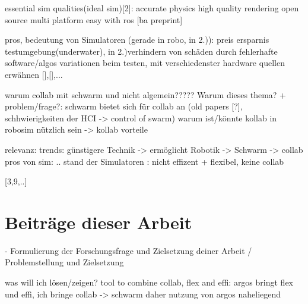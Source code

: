 \documentclass[german,version-2020-11]{uzl-thesis}
\begin{document}
essential sim qualities(ideal sim)[2]:
	accurate physics
	high quality rendering
	open source
	multi platform
	easy with ros
[ba preprint]





      
      
      pros, bedeutung von Simulatoren (gerade in robo, in 2.)):
        preis ersparnis  testumgebung(underwater), 
        in 2.)verhindern von schäden durch fehlerhafte software/algos
        variationen beim testen, mit verschiedenster hardware  
        quellen erwähnen [],[],...

    
      



      \begin{Code}

      warum collab mit schwarm und nicht algemein?????
        Warum dieses thema? + problem/frage?:
      schwarm bietet sich für collab an  (old papers [?], schhwierigkeiten der HCI -> control of swarm)
      warum ist/könnte kollab in robosim nützlich sein -> kollab vorteile

      relevanz:
      trends: günstigere Technik -> ermöglicht Robotik -> Schwarm -> collab
      pros von sim: ..
      stand der Simulatoren : nicht effizent + flexibel, keine collab

      [3,9,..]

    


      \end{Code}







\section{Beiträge dieser Arbeit}

%

- Formulierung der Forschungsfrage und Zielsetzung deiner Arbeit / Problemstellung und Zielsetzung

was will ich lösen/zeigen?
tool to combine collab, flex and effi:
argos bringt flex und effi,
ich bringe collab
-> schwarm daher nutzung von argos naheliegend
\end{document}
